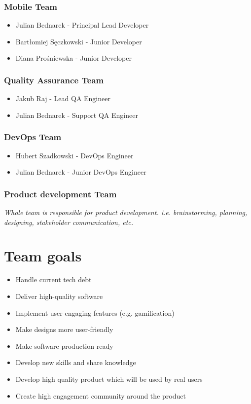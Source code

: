 \documentclass[12pt]{article}
\begin{document}
\subsubsection*{Mobile Team}
\begin{itemize}
    \item Julian Bednarek - Principal Lead Developer
    \item Bartłomiej Sęczkowski - Junior Developer
    \item Diana Prośniewska - Junior Developer
\end{itemize}
\subsubsection*{Quality Assurance Team}
\begin{itemize}
    \item Jakub Raj - Lead QA Engineer
    \item Julian Bednarek - Support QA Engineer
\end{itemize}
\subsubsection*{DevOps Team}
\begin{itemize}
    \item Hubert Szadkowski - DevOps Engineer
    \item Julian Bednarek - Junior DevOps Engineer
\end{itemize}
\subsubsection*{Product development Team}
\textit{Whole team is responsible for product development. i.e. brainstorming, planning, designing, stakeholder communication, etc.}
\section{Team goals}
\begin{itemize}
    \item Handle current tech debt
    \item Deliver high-quality software
    \item Implement user engaging features (e.g. gamification)
    \item Make designs more user-friendly
    \item Make software production ready
    \item Develop new skills and share knowledge
    \item Develop high quality product which will be used by real users
    \item Create high engagement community around the product
\end{itemize}
\end{document}
